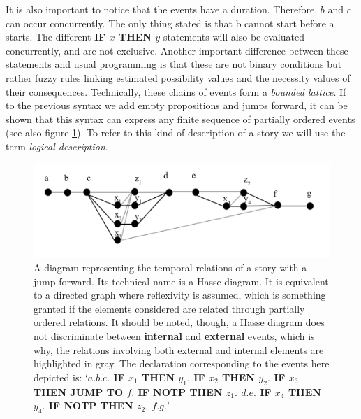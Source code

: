 \documentclass[
		twoside,openright,titlepage,numbers=noenddot,manychapters,
		headinclude,%
                footinclude=false,cleardoublepage=empty,
                BCOR=5mm,
		fontsize=11pt, %
                 enabledeprecatedfontcommands]{scrreprt}
\begin{document}
It is also important to notice that the events have a duration. Therefore, $b$ and $c$ can occur concurrently. The only thing stated is that b cannot start before a starts. The different \textbf{IF $x$ THEN $y$} statements will also be evaluated concurrently, and are not exclusive. Another important difference between these statements and usual programming is that these are not binary conditions but rather fuzzy rules linking estimated possibility values and the necessity values of their consequences.
Technically, these chains of events form a \emph{bounded lattice}. If to the previous syntax we add empty propositions and jumps forward, it can be shown that this syntax can express any finite sequence of partially ordered events (see also figure \ref{fig_story_hasse}). To refer to this kind of description of a story we will use the term \emph{logical description}.






\begin{figure}[]

\begin{center}
\includegraphics[width=12cm]{figures/story_hasse.jpg}
\end{center}
\caption{A diagram representing the temporal relations of a story with a jump forward.
  Its technical name is a Hasse diagram. It is equivalent to a directed graph where reflexivity is assumed, which is something granted if the elements considered are related through partially ordered relations. It should be noted, though, a Hasse diagram does not discriminate between \textbf{internal} and \textbf{external} events, which is why, the relations involving both external and internal elements are highlighted in gray.
The declaration corresponding to  the events here depicted is:
 `\textbf{$a.b.c.$ IF $x_1$ THEN $y_1.$ IF $x_2$ THEN $y_2.$ IF $x_3$ THEN JUMP TO $f.$ IF NOTP THEN $z_1.$ $d.e.$  IF $x_4$ THEN $y_4.$ IF NOTP THEN $z_2.$ $f.g.$}'
}
\label{fig_story_hasse}

\end{figure}
\end{document}
